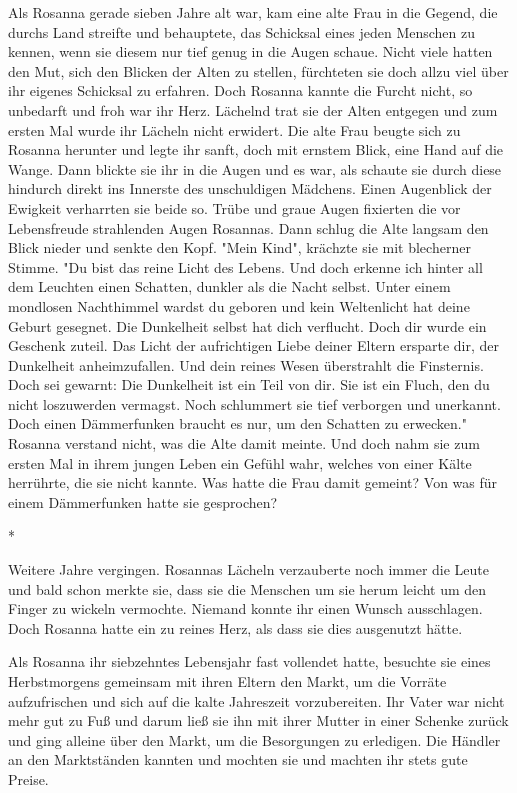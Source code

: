 \documentclass[10pt, a4paper, oneside]{book}
\begin{document}
\begin{multicols}{2}
Als Rosanna gerade sieben Jahre alt war, kam eine alte Frau in die Gegend, die durchs Land streifte und behauptete, das Schicksal eines jeden Menschen zu kennen, wenn sie diesem nur tief genug in die Augen schaue. Nicht viele hatten den Mut, sich den Blicken der Alten zu stellen, fürchteten sie doch allzu viel über ihr eigenes Schicksal zu erfahren. Doch Rosanna kannte die Furcht nicht, so unbedarft und froh war ihr Herz. Lächelnd trat sie der Alten entgegen und zum ersten Mal wurde ihr Lächeln nicht erwidert. Die alte Frau beugte sich zu Rosanna herunter und legte ihr sanft, doch mit ernstem Blick, eine Hand auf die Wange. Dann blickte sie ihr in die Augen und es war, als schaute sie durch diese hindurch direkt ins Innerste des unschuldigen Mädchens. Einen Augenblick der Ewigkeit verharrten sie beide so. Trübe und graue Augen fixierten die vor Lebensfreude strahlenden Augen Rosannas. Dann schlug die Alte langsam den Blick nieder und senkte den Kopf. "Mein Kind", krächzte sie mit blecherner Stimme. "Du bist das reine Licht des Lebens. Und doch erkenne ich hinter all dem Leuchten einen Schatten, dunkler als die Nacht selbst. Unter einem mondlosen Nachthimmel wardst du geboren und kein Weltenlicht hat deine Geburt gesegnet. Die Dunkelheit selbst hat dich verflucht. Doch dir wurde ein Geschenk zuteil. Das Licht der aufrichtigen Liebe deiner Eltern ersparte dir, der Dunkelheit anheimzufallen. Und dein reines Wesen überstrahlt die Finsternis. Doch sei gewarnt: Die Dunkelheit ist ein Teil von dir. Sie ist ein Fluch, den du nicht loszuwerden vermagst. Noch schlummert sie tief verborgen und unerkannt. Doch einen Dämmerfunken braucht es nur, um den Schatten zu erwecken." Rosanna verstand nicht, was die Alte damit meinte. Und doch nahm sie zum ersten Mal in ihrem jungen Leben ein Gefühl wahr, welches von einer Kälte herrührte, die sie nicht kannte. Was hatte die Frau damit gemeint? Von was für einem Dämmerfunken hatte sie gesprochen? 

\begin{center}
    *
\end{center}

Weitere Jahre vergingen. Rosannas Lächeln verzauberte noch immer die Leute und bald schon merkte sie, dass sie die Menschen um sie herum leicht um den Finger zu wickeln vermochte. Niemand konnte ihr einen Wunsch ausschlagen. Doch Rosanna hatte ein zu reines Herz, als dass sie dies ausgenutzt hätte.\bigskip

Als Rosanna ihr siebzehntes Lebensjahr fast vollendet hatte, besuchte sie eines Herbstmorgens gemeinsam mit ihren Eltern den Markt, um die Vorräte aufzufrischen und sich auf die kalte Jahreszeit vorzubereiten. Ihr Vater war nicht mehr gut zu Fuß und darum ließ sie ihn mit ihrer Mutter in einer Schenke zurück und ging alleine über den Markt, um die Besorgungen zu erledigen. Die Händler an den Marktständen kannten und mochten sie und machten ihr stets gute Preise.\bigskip


\end{multicols}
\end{document}
